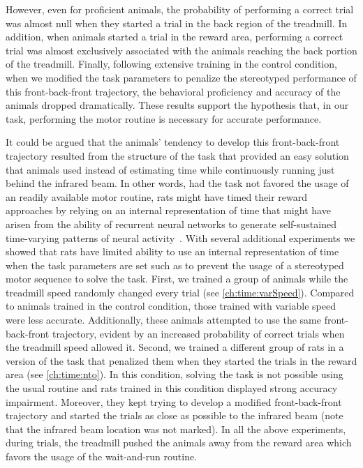 However, even for proficient animals, the probability of performing a correct trial was almost null when they started a trial in the back region of the treadmill.
In addition, when animals started a trial in the reward area, performing a correct trial was almost exclusively associated with the animals reaching the back portion of the treadmill.
Finally, following extensive training in the control condition, when we modified the task parameters to penalize the stereotyped performance of this front-back-front trajectory, the behavioral proficiency and accuracy of the animals dropped dramatically.
These results support the hypothesis that, in our task, performing the motor routine is necessary for accurate performance.
\par
It could be argued that the animals' tendency to develop this front-back-front trajectory resulted from the structure of the task that provided an easy solution that animals used instead of estimating time while continuously running just behind the infrared beam.
In other words, had the task not favored the usage of an readily available motor routine, rats might have timed their reward approaches by relying on an internal representation of time that might have arisen from the ability of recurrent neural networks to generate self-sustained time-varying patterns of neural activity~\cite{Buonomano2011chapter}.
With several additional experiments we showed that rats have limited ability to use an internal representation of time when the task parameters are set such as to prevent the usage of a stereotyped motor sequence to solve the task.
First, we trained a group of animals while the treadmill speed randomly changed every trial (see \autoref{ch:time:varSpeed}).
Compared to animals trained in the control condition, those trained with variable speed were less accurate.
Additionally, these animals attempted to use the same front-back-front trajectory, evident by an increased probability of correct trials when the treadmill speed allowed it.
Second, we trained a different group of rats in a version of the task that penalized them when they started the trials in the reward area (see \autoref{ch:time:nto}).
In this condition, solving the task is not possible using the usual routine and rats trained in this condition displayed strong accuracy impairment.
Moreover, they kept trying to develop a modified front-back-front trajectory and started the trials as close as possible to the infrared beam (note that the infrared beam location was not marked).
In all the above experiments, during trials, the treadmill pushed the animals away from the reward area which favors the usage of the wait-and-run routine.
